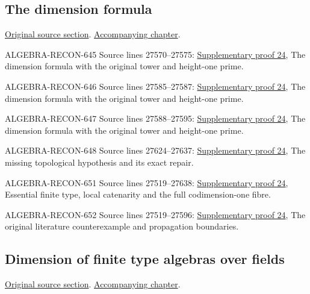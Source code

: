 \subsection{The dimension formula}
\hypertarget{algebra-source-section-dimension-formula}{}
\noindent\href{https://github.com/stacks/stacks-project/blob/a04446e57ec1fbc252a871afcec7752fb2807b14/algebra.tex\#L27512}{Original source section}. \href{algebra.pdf\#nameddest=section-dimension-formula}{Accompanying chapter}.

\begin{AlgebraSourceRoutes}
\item[ALGEBRA-RECON-645] Source lines 27570--27575: \hyperlink{algebra_dimension_maps_notes_20260928}{Supplementary proof 24}, The dimension formula with the original tower and height-one prime.
\item[ALGEBRA-RECON-646] Source lines 27585--27587: \hyperlink{algebra_dimension_maps_notes_20260928}{Supplementary proof 24}, The dimension formula with the original tower and height-one prime.
\item[ALGEBRA-RECON-647] Source lines 27588--27595: \hyperlink{algebra_dimension_maps_notes_20260928}{Supplementary proof 24}, The dimension formula with the original tower and height-one prime.
\item[ALGEBRA-RECON-648] Source lines 27624--27637: \hyperlink{algebra_dimension_maps_notes_20260928}{Supplementary proof 24}, The missing topological hypothesis and its exact repair.
\item[ALGEBRA-RECON-651] Source lines 27519--27638: \hyperlink{algebra_dimension_maps_notes_20260928}{Supplementary proof 24}, Essential finite type, local catenarity and the full codimension-one fibre.
\item[ALGEBRA-RECON-652] Source lines 27519--27596: \hyperlink{algebra_dimension_maps_notes_20260928}{Supplementary proof 24}, The original literature counterexample and propagation boundaries.
\end{AlgebraSourceRoutes}

\subsection{Dimension of finite type algebras over fields}
\hypertarget{algebra-source-section-dimension-finite-type-algebras}{}
\noindent\href{https://github.com/stacks/stacks-project/blob/a04446e57ec1fbc252a871afcec7752fb2807b14/algebra.tex\#L27648}{Original source section}. \href{algebra.pdf\#nameddest=section-dimension-finite-type-algebras}{Accompanying chapter}.

